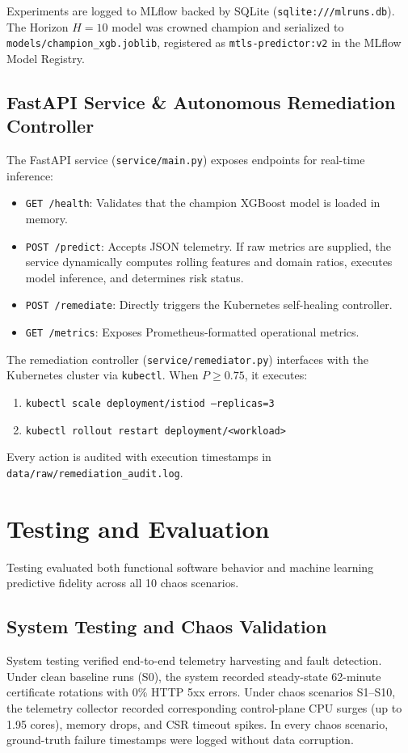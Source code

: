\documentclass[12pt,a4paper]{report}
\newcommand{\code}[1]{\texttt{\small #1}}
\begin{document}
Experiments are logged to MLflow backed by SQLite (\code{sqlite:///mlruns.db}). The Horizon $H=10$ model was crowned champion and serialized to \code{models/champion\_xgb.joblib}, registered as \code{mtls-predictor:v2} in the MLflow Model Registry.

\section{FastAPI Service \& Autonomous Remediation Controller}
The FastAPI service (\code{service/main.py}) exposes endpoints for real-time inference:
\begin{itemize}
    \item \code{GET /health}: Validates that the champion XGBoost model is loaded in memory.
    \item \code{POST /predict}: Accepts JSON telemetry. If raw metrics are supplied, the service dynamically computes rolling features and domain ratios, executes model inference, and determines risk status.
    \item \code{POST /remediate}: Directly triggers the Kubernetes self-healing controller.
    \item \code{GET /metrics}: Exposes Prometheus-formatted operational metrics.
\end{itemize}

The remediation controller (\code{service/remediator.py}) interfaces with the Kubernetes cluster via \texttt{kubectl}. When $P \ge 0.75$, it executes:
\begin{enumerate}
    \item \texttt{kubectl scale deployment/istiod --replicas=3}
    \item \texttt{kubectl rollout restart deployment/<workload>}
\end{enumerate}
Every action is audited with execution timestamps in \code{data/raw/remediation\_audit.log}.

\chapter{Testing and Evaluation}

Testing evaluated both functional software behavior and machine learning predictive fidelity across all 10 chaos scenarios.

\section{System Testing and Chaos Validation}
System testing verified end-to-end telemetry harvesting and fault detection. Under clean baseline runs (S0), the system recorded steady-state 62-minute certificate rotations with 0\% HTTP 5xx errors. Under chaos scenarios S1–S10, the telemetry collector recorded corresponding control-plane CPU surges (up to 1.95 cores), memory drops, and CSR timeout spikes. In every chaos scenario, ground-truth failure timestamps were logged without data corruption.
\end{document}
